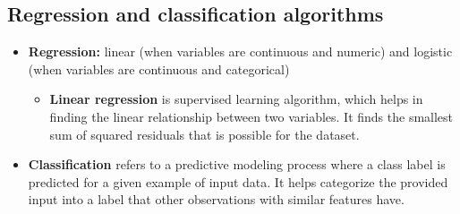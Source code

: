 \documentclass[
  letterpaper,
]{book}
\providecommand{\tightlist}{%
  \setlength{\itemsep}{0pt}\setlength{\parskip}{0pt}}\usepackage{longtable,booktabs,array}
\begin{document}
\hypertarget{regression-and-classification-algorithms}{%
\subsection{Regression and classification
algorithms}\label{regression-and-classification-algorithms}}

\begin{itemize}
\item
  \textbf{Regression:} linear (when variables are continuous and
  numeric) and logistic (when variables are continuous and categorical)

  \begin{itemize}
  \tightlist
  \item
    \textbf{Linear regression} is supervised learning algorithm, which
    helps in finding the linear relationship between two variables. It
    finds the smallest sum of squared residuals that is possible for the
    dataset.
  \end{itemize}
\item
  \textbf{Classification} refers to a predictive modeling process where
  a class label is predicted for a given example of input data. It helps
  categorize the provided input into a label that other observations
  with similar features have.


\end{itemize}
\end{document}

